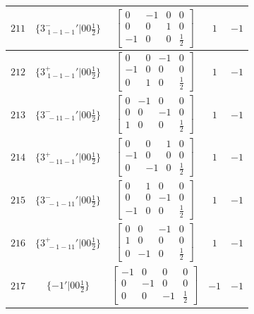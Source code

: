 \documentclass[fleqn,8pt]{jsarticle}
\begin{document}
\begin{longtable}{ccccc}
$ 211 $ & $ \{3^{-}_{\,\,1-1-1}{}'|0 0 \frac{1}{2}\} $ & $ \begin{bmatrix} 0 & -1 & 0 & 0 \\ 0 & 0 & 1 & 0 \\ -1 & 0 & 0 & \frac{1}{2} \end{bmatrix} $ & $ 1 $ & $ -1 $ \\ \hline
$ 212 $ & $ \{3^{+}_{\,\,1-1-1}{}'|0 0 \frac{1}{2}\} $ & $ \begin{bmatrix} 0 & 0 & -1 & 0 \\ -1 & 0 & 0 & 0 \\ 0 & 1 & 0 & \frac{1}{2} \end{bmatrix} $ & $ 1 $ & $ -1 $ \\ \hline
$ 213 $ & $ \{3^{-}_{\,\,-11-1}{}'|0 0 \frac{1}{2}\} $ & $ \begin{bmatrix} 0 & -1 & 0 & 0 \\ 0 & 0 & -1 & 0 \\ 1 & 0 & 0 & \frac{1}{2} \end{bmatrix} $ & $ 1 $ & $ -1 $ \\ \hline
$ 214 $ & $ \{3^{+}_{\,\,-11-1}{}'|0 0 \frac{1}{2}\} $ & $ \begin{bmatrix} 0 & 0 & 1 & 0 \\ -1 & 0 & 0 & 0 \\ 0 & -1 & 0 & \frac{1}{2} \end{bmatrix} $ & $ 1 $ & $ -1 $ \\ \hline
$ 215 $ & $ \{3^{-}_{\,\,-1-11}{}'|0 0 \frac{1}{2}\} $ & $ \begin{bmatrix} 0 & 1 & 0 & 0 \\ 0 & 0 & -1 & 0 \\ -1 & 0 & 0 & \frac{1}{2} \end{bmatrix} $ & $ 1 $ & $ -1 $ \\ \hline
$ 216 $ & $ \{3^{+}_{\,\,-1-11}{}'|0 0 \frac{1}{2}\} $ & $ \begin{bmatrix} 0 & 0 & -1 & 0 \\ 1 & 0 & 0 & 0 \\ 0 & -1 & 0 & \frac{1}{2} \end{bmatrix} $ & $ 1 $ & $ -1 $ \\ \hline
$ 217 $ & $ \{-1{}'|0 0 \frac{1}{2}\} $ & $ \begin{bmatrix} -1 & 0 & 0 & 0 \\ 0 & -1 & 0 & 0 \\ 0 & 0 & -1 & \frac{1}{2} \end{bmatrix} $ & $ -1 $ & $ -1 $ \\ \hline

\end{longtable}
\end{document}
